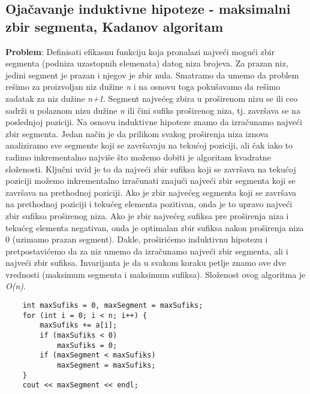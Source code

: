 \documentclass{article}
\begin{document}
\subsection{Ojačavanje induktivne hipoteze - maksimalni zbir segmenta, Kadanov algoritam}
\textbf{Problem}: Definisati efikasnu funkciju koja pronalazi najveći mogući zbir segmenta (podniza uzastopnih elemenata) datog niza brojeva. 
\newline Za prazan niz, jedini segment je prazan i njegov je zbir nula. Smatramo da umemo da problem rešimo za proizvoljan
niz dužine \textit{n} i na osnovu toga pokušavamo da rešimo zadatak za niz dužine \textit{n+1}. Segment najvećeg
zbira u proširenom nizu se ili ceo sadrži u polaznom nizu dužine \textit{n} ili čini sufiks
proširenog niza, tj. završava se na poslednjoj poziciji. Na osnovu induktivne hipoteze znamo da izračunamo
najveći zbir segmenta. Jedan način je da prilikom svakog proširenja niza iznova
analiziramo sve segmente koji se završavaju na tekućoj poziciji, ali čak iako to
radimo inkrementalno najviše što možemo dobiti je algoritam kvadratne složenosti. Ključni uvid je to da najveći zbir
sufiksa koji se završava na tekućoj poziciji možemo inkrementalno izračunati
znajući najveći zbir segmenta koji se završava na prethodnoj poziciji. Ako je zbir najvećeg segmenta koji se završava
na prethodnoj poziciji i tekućeg elementa pozitivan, onda je to upravo najveći
zbir sufiksa proširenog niza. Ako je zbir najvećeg sufiksa pre
proširenja niza i tekućeg elementa negativan, onda je optimalan zbir sufiksa
nakon proširenja niza 0 (uzimamo prazan segment).
Dakle, proširićemo induktivnu hipotezu i pretpostavićemo da za niz umemo da
izračunamo najveći zbir segmenta, ali i najveći zbir sufiksa.
Invarijanta je da u svakom koraku
petlje znamo ove dve vrednosti (maksimum segmenta i maksimum sufiksa). Složenost ovog algoritma je \textit{O(n)}.
\begin{lstlisting}
    int maxSufiks = 0, maxSegment = maxSufiks;
    for (int i = 0; i < n; i++) {
        maxSufiks += a[i];
        if (maxSufiks < 0)
            maxSufiks = 0;
        if (maxSegment < maxSufiks)
            maxSegment = maxSufiks;
    }
    cout << maxSegment << endl;
\end{lstlisting}
\end{document}
